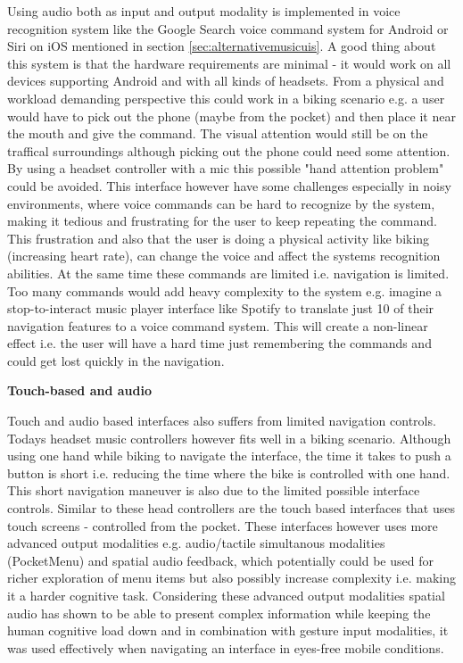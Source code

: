 Using audio both as input and output modality is implemented in voice recognition system like the Google Search voice command system for Android or Siri on iOS mentioned in section \ref{sec:alternativemusicuis}. A good thing about this system is that the hardware requirements are minimal - it would work on all devices supporting Android and with all kinds of headsets. From a physical and workload demanding perspective this could work in a biking scenario e.g. a user would have to pick out the phone (maybe from the pocket) and then place it near the mouth and give the command. The visual attention would still be on the traffical surroundings although picking out the phone could need some attention. By using a headset controller with a mic this possible "hand attention problem" could be avoided. This interface however have some challenges \cite{sawhney_nomadic_2000} especially in noisy environments, where voice commands can be hard to recognize by the system, making it tedious and frustrating for the user to keep repeating the command. This frustration and also that the user is doing a physical activity like biking (increasing heart rate), can change the voice and affect the systems recognition abilities. At the same time these commands are limited i.e. navigation is limited. Too many commands would add heavy complexity to the system e.g. imagine a stop-to-interact music player interface like Spotify to translate just 10 of their navigation features to a voice command system. This will create a non-linear effect i.e. the user will have a hard time just remembering the commands and could get lost quickly in the navigation.

\textbf{Touch-based and audio}

Touch and audio based interfaces also suffers from limited navigation controls. Todays headset music controllers however fits well in a biking scenario. Although using one hand while biking to navigate the interface, the time it takes to push a button is short i.e. reducing the time where the bike is controlled with one hand. This short navigation maneuver is also due to the limited possible interface controls. Similar to these head controllers are the touch based interfaces that uses touch screens \cite{pielot_pocketmenu:_2012, pirhonen_gestural_2002} - controlled from the pocket. These interfaces however uses more advanced output modalities e.g. audio/tactile simultanous modalities (PocketMenu) and spatial audio feedback, which potentially could be used for richer exploration of menu items but also possibly increase complexity i.e. making it a harder cognitive task. Considering these advanced output modalities spatial audio has shown to be able to present complex information \cite{bronkhorst_cocktail_2000, gaver_sonicfinder:_1989} while keeping the human cognitive load down \cite{vazquez-alvarez_eyes-free_2011} and in combination with gesture input modalities, it was used effectively when navigating an interface in eyes-free mobile conditions. 


